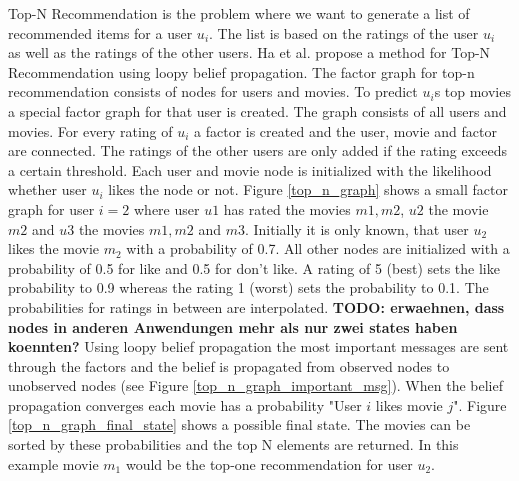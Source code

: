 Top-N Recommendation is the problem where we want to generate a list of recommended items for a user $u_i$. The list is based on the ratings of the user $u_i$ as well as the ratings of the other users. Ha et al. \cite{Ha:2012:TRT:2396761.2398636} propose a method for Top-N Recommendation using loopy belief propagation. The factor graph for top-n recommendation consists of nodes for users and movies. To predict $u_i$s top movies a special factor graph for that user is created. The graph consists of all users and movies. For every rating of $u_i$ a factor is created and the user, movie and factor are connected. The ratings of the other users are only added if the rating exceeds a certain threshold. Each user and movie node is initialized with the likelihood whether user $u_i$ likes the node or not. Figure \ref{top_n_graph} shows a small factor graph for user $i=2$ where user $u1$ has rated the movies $m1,m2$, $u2$ the movie $m2$ and $u3$ the movies $m1,m2$ and $m3$. Initially it is only known, that user $u_2$ likes the movie $m_2$ with a probability of 0.7. All other nodes are initialized with a probability of 0.5 for like and 0.5 for don't like. A rating of 5 (best) sets the like probability to 0.9 whereas the rating 1 (worst) sets the probability to 0.1. The probabilities for ratings in between are interpolated. \textbf{TODO: erwaehnen, dass nodes in anderen Anwendungen mehr als nur zwei states haben koennten?}
Using loopy belief propagation the most important messages are sent through the factors and the belief is propagated from observed nodes to unobserved nodes (see Figure \ref{top_n_graph_important_msg}). When the belief propagation converges each movie has a probability "User $i$ likes movie $j$". Figure \ref{top_n_graph_final_state} shows a possible final state. The movies can be sorted by these probabilities and the top N elements are returned. In this example movie $m_1$ would be the top-one recommendation for user $u_2$.

